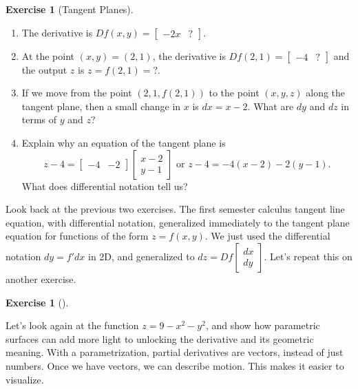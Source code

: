 \documentclass[10pt,]{book}
\theoremstyle{plain}
\theoremstyle{definition}
\theoremstyle{definition}
\theoremstyle{definition}
\theoremstyle{definition}
\newtheorem{exploration}[project]{Exercise}
\theoremstyle{definition}
\numberwithin{equation}{section}
\newcommand{\amp}{&}
\begin{document}
\begin{exploration}[Tangent Planes]\label{prob_tangent_plane_downbowl}
\leavevmode%
\begin{enumerate}[font=\bfseries,label=(\alph*),ref=\alph*]
\item\label{task-319} The derivative is \(Df(x,y) = \begin{bmatrix}-2x\amp ?
\end{bmatrix}\).%
\item\label{task-320} At the point \((x,y)=(2,1)\), the derivative is \(Df(2,1) = \begin{bmatrix}-4\amp ?
\end{bmatrix}\) and the output \(z\) is \(z=f(2,1)=?\).%
\item\label{task-321} If we move from the point \((2,1,f(2,1))\) to the point \((x,y,z)\) along the tangent plane, then a small change in \(x\) is \(dx=x-2\). What are \(dy\) and \(dz\) in terms of \(y\) and \(z\)?%
\item\label{task-322} Explain why an equation of the tangent plane is  %
\begin{equation*}
z-4=\begin{bmatrix}-4 \amp  -2
\end{bmatrix} \begin{bmatrix}x-2\\y-1
\end{bmatrix}  
\text{ or }  
z-4=-4(x-2)-2(y-1).
\end{equation*}
What does differential notation tell us?%
%
\end{enumerate}
\end{exploration}
Look back at the previous two exercises. The first semester calculus tangent line equation, with differential notation, generalized immediately to the tangent plane equation for functions of the form \(z=f(x,y)\). We just used the differential notation \(dy=f'dx\) in 2D, and generalized to \(dz = Df \begin{bmatrix}dx\\dy
\end{bmatrix}\). Let's repeat this on another exercise.%
\begin{exploration}[]\label{exploration-144}
\end{exploration}
Let's look again at the function \(z=9-x^2-y^2\), and show how parametric surfaces can add more light to unlocking the derivative and its geometric meaning. With a parametrization, partial derivatives are vectors, instead of just numbers. Once we have vectors, we can describe motion. This makes it easier to visualize.%
\end{document}

